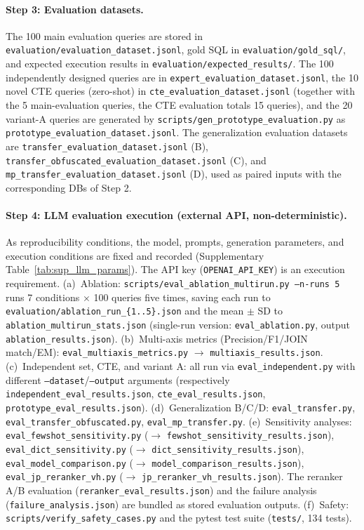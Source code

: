 \paragraph{Step 3: Evaluation datasets.}
The 100 main evaluation queries are stored in \texttt{evaluation/evaluation\_dataset.jsonl}, gold SQL in \texttt{evaluation/gold\_sql/}, and expected execution results in \texttt{evaluation/expected\_results/}. The 100 independently designed queries are in \texttt{expert\_evaluation\_dataset.jsonl}, the 10 novel CTE queries (zero-shot) in \texttt{cte\_evaluation\_dataset.jsonl} (together with the 5 main-evaluation queries, the CTE evaluation totals 15 queries), and the 20 variant-A queries are generated by \texttt{scripts/gen\_prototype\_evaluation.py} as \texttt{prototype\_evaluation\_dataset.jsonl}. The generalization evaluation datasets are \texttt{transfer\_evaluation\_dataset.jsonl} (B), \texttt{transfer\_obfuscated\_evaluation\_dataset.jsonl} (C), and \texttt{mp\_transfer\_evaluation\_dataset.jsonl} (D), used as paired inputs with the corresponding DBs of Step 2.

\paragraph{Step 4: LLM evaluation execution (external API, non-deterministic).}
As reproducibility conditions, the model, prompts, generation parameters, and execution conditions are fixed and recorded (Supplementary Table~\ref{tab:sup_llm_params}). The API key (\texttt{OPENAI\_API\_KEY}) is an execution requirement.
(a)~Ablation: \texttt{scripts/eval\_ablation\_multirun.py --n-runs 5} runs 7 conditions $\times$ 100 queries five times, saving each run to \texttt{evaluation/ablation\_run\_\{1..5\}.json} and the mean $\pm$ SD to \texttt{ablation\_multirun\_stats.json} (single-run version: \texttt{eval\_ablation.py}, output \texttt{ablation\_results.json}).
(b)~Multi-axis metrics (Precision/F1/JOIN match/EM): \texttt{eval\_multiaxis\_metrics.py} $\to$ \texttt{multiaxis\_results.json}.
(c)~Independent set, CTE, and variant A: all run via \texttt{eval\_independent.py} with different \texttt{--dataset}/\texttt{--output} arguments (respectively \texttt{independent\_eval\_results.json}, \texttt{cte\_eval\_results.json}, \texttt{prototype\_eval\_results.json}).
(d)~Generalization B/C/D: \texttt{eval\_transfer.py}, \texttt{eval\_transfer\_obfuscated.py}, \texttt{eval\_mp\_transfer.py}.
(e)~Sensitivity analyses: \texttt{eval\_fewshot\_sensitivity.py} ($\to$ \texttt{fewshot\_sensitivity\_results.json}), \texttt{eval\_dict\_sensitivity.py} ($\to$ \texttt{dict\_sensitivity\_results.json}), \texttt{eval\_model\_comparison.py} ($\to$ \texttt{model\_comparison\_results.json}), \texttt{eval\_jp\_reranker\_vh.py} ($\to$ \texttt{jp\_reranker\_vh\_results.json}). The reranker A/B evaluation (\texttt{reranker\_eval\_results.json}) and the failure analysis (\texttt{failure\_analysis.json}) are bundled as stored evaluation outputs.
(f)~Safety: \texttt{scripts/verify\_safety\_cases.py} and the pytest test suite (\texttt{tests/}, 134 tests).

